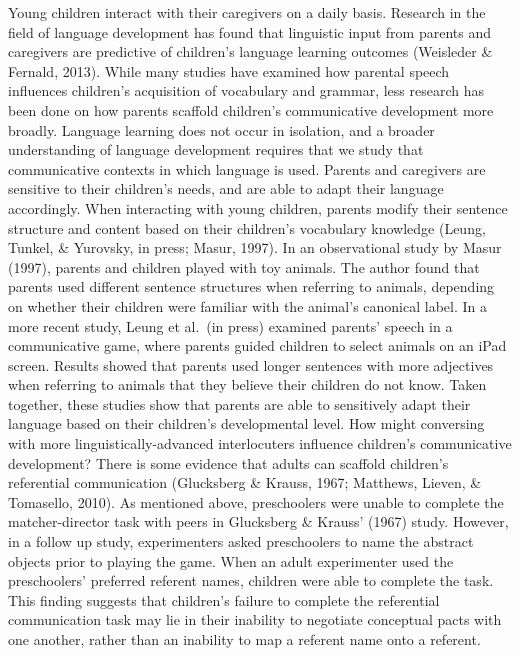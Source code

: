 \documentclass[10pt, letterpaper]{article}
\begin{document}
Young children interact with their caregivers on a daily basis. Research
in the field of language development has found that linguistic input
from parents and caregivers are predictive of children's language
learning outcomes (Weisleder \& Fernald, 2013). While many studies have
examined how parental speech influences children's acquisition of
vocabulary and grammar, less research has been done on how parents
scaffold children's communicative development more broadly. Language
learning does not occur in isolation, and a broader understanding of
language development requires that we study that communicative contexts
in which language is used. Parents and caregivers are sensitive to their
children's needs, and are able to adapt their language accordingly. When
interacting with young children, parents modify their sentence structure
and content based on their children's vocabulary knowledge (Leung,
Tunkel, \& Yurovsky, in press; Masur, 1997). In an observational study
by Masur (1997), parents and children played with toy animals. The
author found that parents used different sentence structures when
referring to animals, depending on whether their children were familiar
with the animal's canonical label. In a more recent study, Leung et
al.~(in press) examined parents' speech in a communicative game, where
parents guided children to select animals on an iPad screen. Results
showed that parents used longer sentences with more adjectives when
referring to animals that they believe their children do not know. Taken
together, these studies show that parents are able to sensitively adapt
their language based on their children's developmental level. How might
conversing with more linguistically-advanced interlocuters influence
children's communicative development? There is some evidence that adults
can scaffold children's referential communication (Glucksberg \& Krauss,
1967; Matthews, Lieven, \& Tomasello, 2010). As mentioned above,
preschoolers were unable to complete the matcher-director task with
peers in Glucksberg \& Krauss' (1967) study. However, in a follow up
study, experimenters asked preschoolers to name the abstract objects
prior to playing the game. When an adult experimenter used the
preschoolers' preferred referent names, children were able to complete
the task. This finding suggests that children's failure to complete the
referential communication task may lie in their inability to negotiate
conceptual pacts with one another, rather than an inability to map a
referent name onto a referent.
\end{document}
